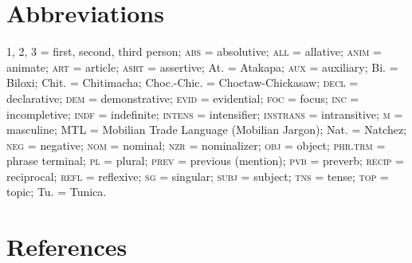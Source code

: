 \documentclass[output=paper]{LSP/langsci}
\begin{document}
\section* {Abbreviations}
 \textsc{1, 2, 3} = first, second, third person; \textsc{abs} = absolutive; \textsc{all} = allative; \textsc{anim} = animate; \textsc{art} = article; \textsc{asrt} = assertive; At. = Atakapa; \textsc{aux} = auxiliary; Bi. = Biloxi; Chit. = Chitimacha; Choc.-Chic. = Choctaw-Chickasaw; \textsc{decl} = declarative; \textsc{dem} = demonstrative; \textsc{evid} = evidential; \textsc{foc} = focus; \textsc{inc} = incompletive; \textsc{indf} = indefinite;  \textsc{intens} = intensifier; \textsc{instrans} = intransitive; \textsc{m} = masculine; MTL = Mobilian Trade Language (Mobilian Jargon); Nat. = Natchez; \textsc{neg} = negative; \textsc{nom} = nominal; \textsc{nzr} = nominalizer; \textsc{obj} = object; \textsc{phr.trm} = phrase terminal; \textsc{pl} = plural; \textsc{prev} = previous (mention); \textsc{pvb} = preverb; \textsc{recip} = reciprocal; \textsc{refl} = reflexive; \textsc{sg} = singular; \textsc{subj} = subject; \textsc{tns} = tense;  \textsc{top} = topic; Tu. = Tunica.

 

\printbibliography[heading=subbibliography,notkeyword=this]

\section*{References}

\newenvironment{reflist} {\begin{list} {} {\listparindent -.25in
\leftmargin .3in} \item \ \vspace{-.3in} } {\end{list} }
\end{document}
